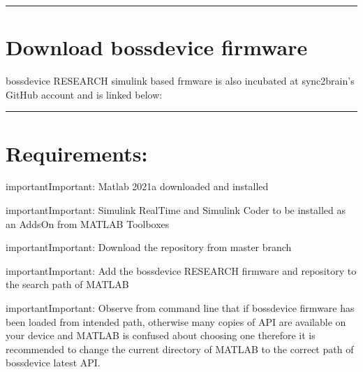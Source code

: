 \documentclass[letterpaper,10pt,english]{sphinxmanual}
\begin{document}
\bigskip\hrule\bigskip



\section{Download bossdevice firmware}
\label{\detokenize{6_downloads_n_dependencies:download-bossdevice-firmware}}
\sphinxAtStartPar
bossdevice RESEARCH simulink based frmware is also incubated at sync2brain’s GitHub account and is linked below:

\begin{sphinxVerbatim}[commandchars=\\\{\}]
\end{sphinxVerbatim}


\bigskip\hrule\bigskip



\section{Requirements:}
\label{\detokenize{6_downloads_n_dependencies:requirements}}
\begin{sphinxadmonition}{important}{Important:}
\sphinxAtStartPar
Matlab 2021a downloaded and installed
\end{sphinxadmonition}

\begin{sphinxadmonition}{important}{Important:}
\sphinxAtStartPar
Simulink Real\sphinxhyphen{}Time and Simulink Coder to be installed as an Adds\sphinxhyphen{}On from MATLAB Toolboxes
\end{sphinxadmonition}

\begin{sphinxadmonition}{important}{Important:}
\sphinxAtStartPar
Download the repository from master branch
\end{sphinxadmonition}

\begin{sphinxadmonition}{important}{Important:}
\sphinxAtStartPar
Add the bossdevice RESEARCH firmware and repository to the search path of MATLAB
\end{sphinxadmonition}

\begin{sphinxadmonition}{important}{Important:}
\sphinxAtStartPar
Observe from command line that if bossdevice firmware has been loaded from intended path, otherwise many copies of API are available on your device and MATLAB is confused about choosing one therefore it is recommended to change the current directory of MATLAB to the correct path of bossdevice latest API.
\end{sphinxadmonition}
\end{document}
